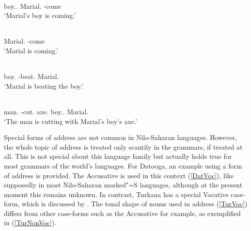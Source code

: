 \begin{exe}
\ex\label{DinGen}
\begin{xlist}
\raggedright
\ex\gll{}  \textbf{} \\
boy.\antgen{}.\acc{} \partic{} Marial.\nom{} \decl{}-come\\
\glt `Marial's boy is coming.'

\ex\gll{} \\
 Marial.\acc{} \decl{}-come\\
\glt `Marial is coming.'

\ex\gll{}  \\
 boy.\acc{} \decl{}-beat.\nts{} Marial.\nom{}\\
\glt`Marial is beating the boy.'
 
\ex\gll{}      \textbf{} \\
man.\acc{} \decl{}-cut.\antip{} \prep{} axe.\antgen{} \partic{} boy.\antgen{}.\nom{} \partic{} Marial.\nom{}\\
\glt `The man is cutting with Marial's boy's axe.' 
\end{xlist}
\end{exe}

Special forms of address are not common in Nilo-Saharan languages. 
However, the whole topic of address is treated only scantily in the grammars, if treated at all.
This is not special about this language family but actually holds true for most grammars of the world's languages.
For Datooga, an example using a form of address is provided. 
The Accusative is used in this context (\ref{DatVoc}), like supposedly in most Nilo-Saharan marked"=S languages, although at the present moment this remains unknown. 
In contrast, Turkana has a special Vocative case-form, which is discussed by \citet[67, 268--269]{Dimmendaal:1982}.
The tonal shape of nouns used in address (\ref{TurVoc}) differs from other case-forms such as the Accusative for example, as exemplified in (\ref{TurNonVoc}).

